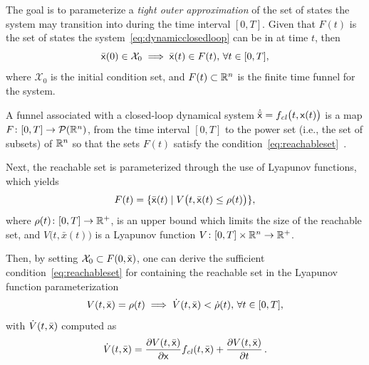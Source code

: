 The goal is to parameterize a \textit{tight outer approximation} of the set of
states the system may transition into during the time interval \([0,T]\). Given
that \(F(t)\) is the set of states the system~\cref{eq:dynamicclosedloop} can be
in at time \(t\), then
\begin{equation}
  \label{eq:reachableset}
  \bar{{\mathbf{\mathsf{x}}}}(0) \in \mathcal{X}_0 \implies \bar{{\mathbf{\mathsf{x}}}}(t) \in F(t), \, \forall t \in [0,T],
\end{equation}
where \(\mathcal{X}_0\) is the initial condition set, and \(F(t) \subset \mathbb{R}^n\)
is the finite time funnel for the system.

\begin{definition}
  \label{def:funnel}
  A funnel associated with a closed-loop dynamical system \(\dot{\bar{{\mathbf{\mathsf{x}}}}}
  = f_{\mathit{cl}}\big( t,{\mathbf{\mathsf{x}}}(t) \big) \) is a map \(F \colon [0,T]
  \rightarrow \mathcal{P}(\mathbb{R}^n)\), from the time interval \([0,T]\) to the power
  set (i.e., the set of subsets) of \(\mathbb{R}^n\) so that the sets \(F(t)\) satisfy
  the
  condition~\cref{eq:reachableset}~\cite{majumdarFunnelLibrariesRealtime2017}.
\end{definition}

Next, the reachable set is parameterized through the use of Lyapunov functions,
which yields
\begin{equation}
  F(t) = \lbrace\bar{{\mathbf{\mathsf{x}}}}(t) \mid V \big(t, \bar{{\mathbf{\mathsf{x}}}}(t) \leq \rho (t) \big)\rbrace,
\end{equation}
where \(\rho (t) \colon [0,T] \rightarrow \mathbb{R}^+\), is an upper bound which limits
the size of the reachable set, and \(V \big(t,\bar{x}(t) \big)\) is a Lyapunov
function \(V \colon [0,T] \times \mathbb{R}^n \rightarrow \mathbb{R}^+\).

Then, by setting \(\mathcal{X}_0 \subset F(0,\bar{{\mathbf{\mathsf{x}}}})\), one can derive
the sufficient condition~\cref{eq:reachableset} for containing the reachable set
in the Lyapunov function parameterization
\begin{equation}
  \label{eq:funnelsufficient}
  V(t,\bar{{\mathbf{\mathsf{x}}}}) = \rho(t) \implies \dot{V}(t,\bar{{\mathbf{\mathsf{x}}}}) < \dot{\rho}(t), \, \forall t \in [0,T], 
\end{equation}
with \(\dot{V}(t,\bar{{\mathbf{\mathsf{x}}}})\) computed as
\begin{equation}
  \dot{V}(t,\bar{{\mathbf{\mathsf{x}}}}) = \frac{\partial V(t,\bar{{\mathbf{\mathsf{x}}}})}{\partial {\mathbf{\mathsf{x}}}} f_{\mathit{cl}}(t,\bar{{\mathbf{\mathsf{x}}}}) + \frac{\partial V(t,\bar{{\mathbf{\mathsf{x}}}})}{\partial t} \, .
\end{equation}

